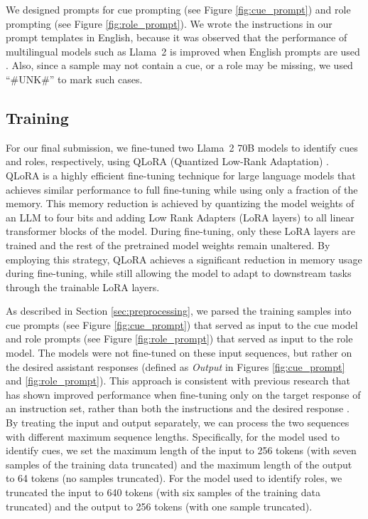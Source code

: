 \documentclass[11pt,a4paper]{article}
\begin{document}
We designed prompts for cue prompting (see Figure \ref{fig:cue_prompt}) and role prompting (see Figure \ref{fig:role_prompt}).
We wrote the instructions in our prompt templates in English, because it was observed that the performance of multilingual models such as Llama~2 is improved when English prompts are used \cite{Fu2022,Huang2023}.
Also, since a sample may not contain a cue, or a role may be missing, we used ``\#UNK\#'' to mark such cases.
 
\subsection{Training}
\label{sec:training}

For our final submission, we fine-tuned two Llama~2 70B models to identify cues and roles, respectively, using QLoRA (Quantized Low-Rank Adaptation) \cite{Dettmers2023}.
QLoRA is a highly efficient fine-tuning technique for large language models that achieves similar performance to full fine-tuning while using only a fraction of the memory.
This memory reduction is achieved by quantizing the model weights of an LLM to four bits and adding Low Rank Adapters (LoRA layers) to all linear transformer blocks of the model.
During fine-tuning, only these LoRA layers are trained and the rest of the pretrained model weights remain unaltered.
By employing this strategy, QLoRA achieves a significant reduction in memory usage during fine-tuning, while still allowing the model to adapt to downstream tasks through the trainable LoRA layers.

As described in Section \ref{sec:preprocessing}, we parsed the training samples into cue prompts (see Figure \ref{fig:cue_prompt}) that served as input to the cue model and role prompts (see Figure \ref{fig:role_prompt}) that served as input to the role model.
The models were not fine-tuned on these input sequences, but rather on the desired assistant responses (defined as \emph{Output} in Figures \ref{fig:cue_prompt} and \ref{fig:role_prompt}).
This approach is consistent with previous research that has shown improved performance when fine-tuning only on the target response of an instruction set, rather than both the instructions and the desired response \cite{Dettmers2023}.
By treating the input and output separately, we can process the two sequences with different maximum sequence lengths.
Specifically, for the model used to identify cues, we set the maximum length of the input to 256 tokens (with seven samples of the training data truncated) and the maximum length of the output to 64 tokens (no samples truncated).
For the model used to identify roles, we truncated the input to 640 tokens (with six samples of the training data truncated) and the output to 256 tokens (with one sample truncated).
\end{document}
